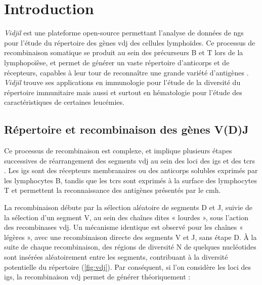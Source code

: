 \chapter{Introduction}

\textit{Vidjil} est une plateforme open-source \cite{giraudFastMulticlonalClusterization2014b}
permettant l'analyse de données de \gls{ngs} pour l'étude du répertoire des gènes \gls{vdj} des 
cellules lymphoïdes. Ce processus de recombinaison somatique se produit au sein des précurseurs
B et T lors de la lymphopoïèse, et permet de générer un vaste répertoire d'anticorps et de récepteurs,
capables à leur tour de reconnaître une grande variété d'antigènes \cite{jonesTamingTransposonVDJ2004}. 
\textit{Vidjil} trouve ses applications en immunologie pour l'étude de la diversité du répertoire immunitaire 
mais aussi et surtout en hématologie pour l'étude des caractéristiques de certaines leucémies.

\section{Répertoire et recombinaison des gènes V(D)J}

Ce processus de recombinaison est complexe, et implique plusieurs étapes successives de réarrangement des segments \gls{vdj} 
au sein des loci des \glspl{ig} et des \glspl{tcr} \cite{rothVDJRecombinationMechanism2014}. Les \glspl{ig} sont des récepteurs membranaires 
ou des anticorps solubles exprimés par les lymphocytes B, tandis que les \glspl{tcr} sont exprimés à la surface des lymphocytes T et permettent 
la reconnaissance des antigènes présentés par le \gls{cmh}.

\vspace{1em}

La recombinaison débute par la sélection aléatoire de segments D et J, suivie de la sélection d'un segment V, au sein des chaînes dites « lourdes », 
sous l'action des recombinases \gls{vdj}. Un mécanisme identique est observé pour les chaînes « légères », avec une recombinaison directe des segments V et J, 
sans étape D. À la suite de chaque recombinaison, des régions de diversité N de quelques nucléotides sont insérées aléatoirement entre les segments, 
contribuant à la diversité potentielle du répertoire (\autoref{fig:vdj}). Par conséquent, si l'on considère les loci des \glspl{ig}, la recombinaison \gls{vdj} 
permet de générer théoriquement : 

